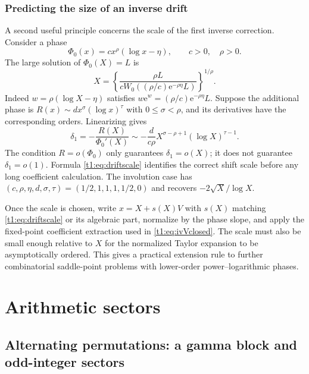 \documentclass[11pt,openany]{book}
\numberwithin{equation}{chapter}
\theoremstyle{plain}
\theoremstyle{definition}
\theoremstyle{remark}
\newcommand{\ee}{\mathrm e}
\begin{document}
\section{Predicting the size of an inverse drift}
A second useful principle concerns the scale of the first inverse correction. Consider a phase
\begin{equation}
 \Phi_0(x)=c x^\rho(\log x-\eta),\qquad c>0,\quad\rho>0.
 \label{t1:eq:powerlogphase}
\end{equation}
The large solution of $\Phi_0(X)=L$ is
\begin{equation}
 X=\left\{\frac{\rho L}{cW_0((\rho/c)\ee^{-\rho\eta}L)}\right\}^{1/\rho}.
 \label{t1:eq:powerlogcore}
\end{equation}
Indeed $w=\rho(\log X-\eta)$ satisfies $w\ee^w=(\rho/c)\ee^{-\rho\eta}L$.
Suppose the additional phase is
$R(x)\sim d x^\sigma(\log x)^\tau$ with $0\le\sigma<\rho$, and its derivatives have the corresponding orders. Linearizing gives
\begin{equation}
 \delta_1=-\frac{R(X)}{\Phi_0'(X)}
 \sim-\frac d{c\rho}X^{\sigma-\rho+1}(\log X)^{\tau-1}.
 \label{t1:eq:driftscale}
\end{equation}
The condition $R=o(\Phi_0)$ only guarantees $\delta_1=o(X)$; it does not guarantee $\delta_1=o(1)$. Formula \eqref{t1:eq:driftscale} identifies the correct shift scale before any long coefficient calculation. The involution case has $(c,\rho,\eta,d,\sigma,\tau)=(1/2,1,1,1,1/2,0)$ and recovers $-2\sqrt X/\log X$.

Once the scale is chosen, write $x=X+s(X)V$ with $s(X)$ matching \eqref{t1:eq:driftscale} or its algebraic part, normalize by the phase slope, and apply the fixed-point coefficient extraction used in \eqref{t1:eq:ivVclosed}. The scale must also be small enough relative to $X$ for the normalized Taylor expansion to be asymptotically ordered. This gives a practical extension rule to further combinatorial saddle-point problems with lower-order power--logarithmic phases.

\part{Arithmetic sectors}
\label{ct:part:arithmetic}

\chapter{Alternating permutations: a gamma block and odd-integer sectors}
\label{ct:ch:zigzag}
\end{document}

